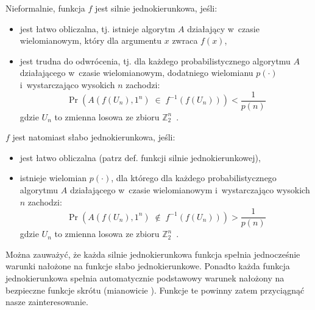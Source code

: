 \noindent Nieformalnie, funkcja $f$ jest silnie jednokierunkowa, jeśli:

\begin{itemize}

    \label{strong_oneway}%
    \item jest łatwo obliczalna, tj. istnieje algorytm $A$
    działający w~czasie wielomianowym, który dla argumentu $x$ zwraca $f(x)$,

    \item jest trudna do odwrócenia, tj. dla każdego probabilistycznego
    algorytmu $A$ działającego w~czasie wielomianowym, dodatniego wielomianu
    $p(\cdot)$ i~wystarczająco wysokich $n$ zachodzi:
        $$\Pr(A(f(U_n),1^n) \; \in \; f^{-1}(f(U_n))) < \frac{1}{p(n)}$$
    gdzie $U_n$ to zmienna losowa ze zbioru
    $\mathbb{Z}_2^n$~\cite{one_way_functions}.

\end{itemize}

\noindent $f$ jest natomiast słabo jednokierunkowa, jeśli:

\begin{itemize}

    \item jest łatwo obliczalna (patrz def. funkcji silnie jednokierunkowej),

    \item istnieje wielomian $p(\cdot)$, dla którego dla każdego
    probabilistycznego algorytmu $A$ działającego w~czasie wielomianowym
    i~wystarczająco wysokich $n$ zachodzi:
        $$\Pr(A(f(U_n),1^n) \; \not\in \; f^{-1}(f(U_n))) > \frac{1}{p(n)}$$
    gdzie $U_n$ to zmienna losowa ze zbioru
    $\mathbb{Z}_2^n$~\cite{one_way_functions}.

\end{itemize}

Można zauważyć, że każda silnie jednokierunkowa funkcja spełnia jednocześnie
warunki nałożone na funkcje słabo jednokierunkowe. Ponadto każda funkcja
jednokierunkowa spełnia automatycznie podstawowy warunek nałożony na bezpieczne
funkcje skrótu (mianowicie ). Funkcje te
powinny zatem przyciągnąć nasze zainteresowanie.



